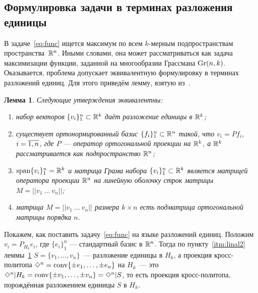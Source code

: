 \documentclass[a4paper,12pt]{article}
\def\co{\mathop{\rm conv}}
\def\span{\mathop{\rm span}}
\def\Gr{\mathbf{\rm Gr}}
\newcommand{\crosp}{\Diamond}
\newcommand{\lb}[1]{#1\nobreak\discretionary{}{\hbox{\ensuremath{#1}}}{}}
\newtheorem{lem}{Лемма}[section]
\numberwithin{equation}{section}
\begin{document}
	\subsection{Формулировка задачи в терминах разложения единицы}
	В задаче~\eqref{eq:func} ищется максимум по всем $k$-мерным подпространствам пространства~$\mathbb {R}^n$. Иными словами, она может рассматриваться как задача максимизации функции, заданной на многообразии Грассмана $\Gr(n,k)$. Оказывается, проблема допускает эквивалентную формулировку в терминах разложений единиц. Для этого приведём лемму, взятую из~\cite{ellips}.
	\begin{lem}\label{lem:linal}
		Следующие утверждения эквивалентны:
		\begin{enumerate}[label=\textnormal{(\arabic*)}]
			\item набор векторов $\{v_i\}_1^n\subset\mathbb {R}^k$ даёт разложение единицы в $\mathbb {R}^k$;\label{itm:linal1}
			\item существует ортонормированный базис $\{f_i\}_1^n\subset\mathbb {R}^n$ такой, что $v_i=Pf_i$, $i\lb=\overline{1,n}$, где $P$ --- оператор ортогональной проекции на $\mathbb {R}^k$, а $\mathbb {R}^k$ рассматривается как подпространство $\mathbb {R}^n$;\label{itm:linal2}
			\item $\span\{v_i\}_1^n=\RR^k$ и матрица Грама набора $\{v_i\}_1^n\subset\mathbb {R}^k$ является матрицей оператора проекции $\mathbb {R}^n$ на линейную оболочку строк матрицы $M=||v_1~\ldots~v_n||$;\label{itm:linal3}
			\item матрица $M=||v_1~\ldots~v_n||$ размера $k\times n$ есть подматрица ортогональной матрицы порядка $n$.\label{itm:linal4}
		\end{enumerate}
	\end{lem}
	Покажем, как поставить задачу~\eqref{eq:func} на языке разложений единиц. Положим $v_i=P_{H_k}e_i$, где $\{e_i\}_1^n$ --- стандартный базис в $\mathbb {R}^n$. Тогда по пункту~\ref{itm:linal2} леммы~\ref{lem:linal} $S=\{v_1,\ldots,v_n\}$~--- разложение единицы в $H_k$, а проекция кросс-политопа $\crosp^n\lb=\co\{\pm e_1,\ldots,\pm e_n\}$ на $H_k$~--- это $\crosp^n|H_k=\co\{\pm v_1,\ldots,\pm v_n\}=\crosp^n|S$, то есть проекция кросс-политопа, порождённая разложением единицы $S$ в $H_k$.
\end{document}
